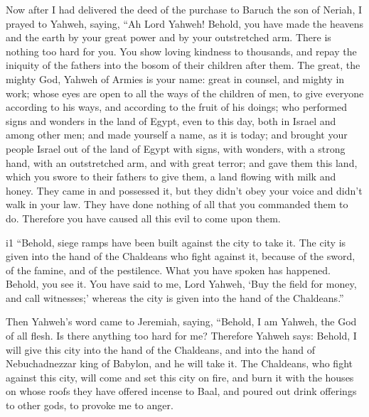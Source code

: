  Now after I had delivered the deed of the purchase to
Baruch the son of Neriah, I prayed to Yahweh, saying,  ``Ah
Lord Yahweh! Behold, you have made the heavens and the earth by your
great power and by your outstretched arm. There is nothing too hard for
you.  You show loving kindness to thousands, and repay the
iniquity of the fathers into the bosom of their children after them. The
great, the mighty God, Yahweh of Armies is your name: 
great in counsel, and mighty in work; whose eyes are open to all the
ways of the children of men, to give everyone according to his ways, and
according to the fruit of his doings;  who performed signs
and wonders in the land of Egypt, even to this day, both in Israel and
among other men; and made yourself a name, as it is today; 
and brought your people Israel out of the land of Egypt with signs, with
wonders, with a strong hand, with an outstretched arm, and with great
terror;  and gave them this land, which you swore to their
fathers to give them, a land flowing with milk and honey. 
They came in and possessed it, but they didn't obey your voice and
didn't walk in your law. They have done nothing of all that you
commanded them to do. Therefore you have caused all this evil to come
upon them.

i1 ``Behold, siege ramps have been built against the city
to take it. The city is given into the hand of the Chaldeans who fight
against it, because of the sword, of the famine, and of the pestilence.
What you have spoken has happened. Behold, you see it.  You
have said to me, Lord Yahweh, `Buy the field for money, and call
witnesses;' whereas the city is given into the hand of the Chaldeans.''

 Then Yahweh's word came to Jeremiah, saying, 
``Behold, I am Yahweh, the God of all flesh. Is there anything too hard
for me?  Therefore Yahweh says: Behold, I will give this
city into the hand of the Chaldeans, and into the hand of Nebuchadnezzar
king of Babylon, and he will take it.  The Chaldeans, who
fight against this city, will come and set this city on fire, and burn
it with the houses on whose roofs they have offered incense to Baal, and
poured out drink offerings to other gods, to provoke me to anger.

